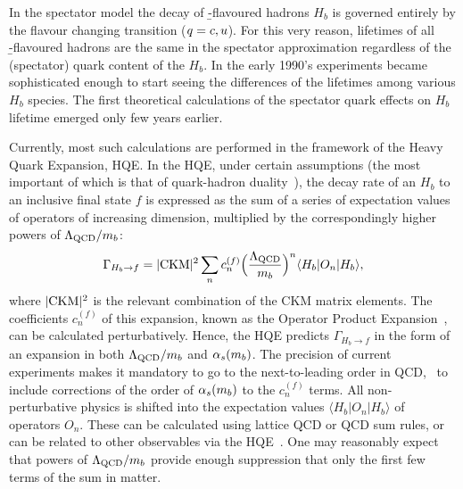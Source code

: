 %
%


In the spectator model the decay of \b-flavoured hadrons $H_b$ is
governed entirely by the flavour changing  transition
($q=c,u$).  For this very reason, lifetimes of all
\b-flavoured hadrons are the same in the spectator approximation
regardless of the (spectator) quark content of the $H_b$.  In the early
1990's experiments became sophisticated enough to start seeing the
differences of the lifetimes among various $H_b$ species.  The first
theoretical calculations of the spectator quark effects on $H_b$
lifetime emerged only few years earlier.

Currently, most such calculations are performed in the framework of
the Heavy Quark Expansion, HQE.  In the HQE, under certain assumptions
(the most important of which is that of
quark-hadron duality~\cite{Shifman:2000jv}), the decay
rate of an $H_b$ to an inclusive final state $f$ is expressed as the sum
of a series of expectation values of operators of increasing dimension,
multiplied by the correspondingly higher powers of $\Lambda_{\rm
QCD}/m_b$:
\begin{equation}
\Gamma_{H_b\to f} = |{\rm CKM}|^2\sum_n c_n^{(f)}
\Bigl(\frac{\Lambda_{\rm QCD}}{m_b}\Bigr)^n\langle H_b|O_n|H_b\rangle,
\labe{hqe}
\end{equation}
where $|{\rm CKM}|^2$ is the relevant combination of the CKM matrix elements.
The coefficients $c_n^{(f)}$ of this expansion, known as the Operator Product
Expansion~\cite{Shifman:1986mx,*Chay:1990da,*Bigi:1992su,*Bigi:1992su_erratum},
can be calculated perturbatively.  Hence, the HQE
predicts $\Gamma_{H_b\to f}$ in the form of an expansion in both
$\Lambda_{\rm QCD}/m_{b}$ and $\alpha_s(m_{b})$.  The precision of
current experiments makes it mandatory to go to the next-to-leading
order in QCD, \ie\ to include corrections of the order of
$\alpha_s(m_{b})$ to the $c_n^{(f)}$ terms.  All non-perturbative physics
is shifted into the expectation values $\langle H_b|O_n|H_b\rangle$ of
operators $O_n$.  These can be calculated using lattice QCD or QCD sum
rules, or can be related to other observables via the
HQE~\cite{Bigi:1995jr,*Bellini:1996ra}.  One may reasonably expect that powers of
$\Lambda_{\rm QCD}/m_{b}$ provide enough suppression that only the
first few terms of the sum in  matter.

